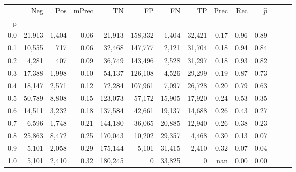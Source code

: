 \begin{tabular}{rrrrrrrrrrrrrr}
\toprule
{} &     Neg &    Pos & mPrec &       TN &       FP &      FN &      TP &  Prec &   Rec & $\hat{p}$ \\
p   &         &        &       &          &          &         &         &       &       &           \\
\midrule
0.0 &  21,913 &  1,404 &  0.06 &   21,913 &  158,332 &   1,404 &  32,421 &  0.17 &  0.96 &      0.89 \\
0.1 &  10,555 &    717 &  0.06 &   32,468 &  147,777 &   2,121 &  31,704 &  0.18 &  0.94 &      0.84 \\
0.2 &   4,281 &    407 &  0.09 &   36,749 &  143,496 &   2,528 &  31,297 &  0.18 &  0.93 &      0.82 \\
0.3 &  17,388 &  1,998 &  0.10 &   54,137 &  126,108 &   4,526 &  29,299 &  0.19 &  0.87 &      0.73 \\
0.4 &  18,147 &  2,571 &  0.12 &   72,284 &  107,961 &   7,097 &  26,728 &  0.20 &  0.79 &      0.63 \\
0.5 &  50,789 &  8,808 &  0.15 &  123,073 &   57,172 &  15,905 &  17,920 &  0.24 &  0.53 &      0.35 \\
0.6 &  14,511 &  3,232 &  0.18 &  137,584 &   42,661 &  19,137 &  14,688 &  0.26 &  0.43 &      0.27 \\
0.7 &   6,596 &  1,748 &  0.21 &  144,180 &   36,065 &  20,885 &  12,940 &  0.26 &  0.38 &      0.23 \\
0.8 &  25,863 &  8,472 &  0.25 &  170,043 &   10,202 &  29,357 &   4,468 &  0.30 &  0.13 &      0.07 \\
0.9 &   5,101 &  2,058 &  0.29 &  175,144 &    5,101 &  31,415 &   2,410 &  0.32 &  0.07 &      0.04 \\
1.0 &   5,101 &  2,410 &  0.32 &  180,245 &        0 &  33,825 &       0 &   nan &  0.00 &      0.00 \\
\bottomrule
\end{tabular}
